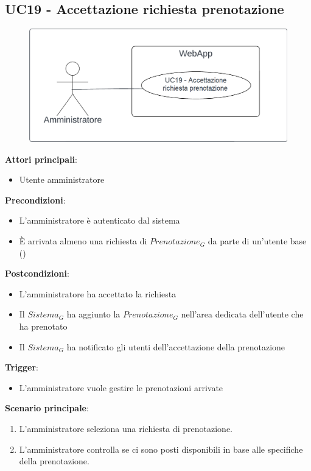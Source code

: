 \subsection{UC19 - Accettazione richiesta prenotazione}\label{usecase:19}
\begin{figure}[H]
    \centering
    \includegraphics[width=0.9\linewidth]{ucd/ucd19.png}
\end{figure}
\textbf{Attori principali}:
\begin{itemize}
    \item Utente amministratore
\end{itemize}
\textbf{Precondizioni}:
\begin{itemize}
    \item L'amministratore è autenticato dal sistema
    \item \`E arrivata almeno una richiesta di $\textit{Prenotazione}_G$ da parte di un'utente base ()
\end{itemize}
\textbf{Postcondizioni}:
\begin{itemize}
    \item L'amministratore ha accettato la richiesta
    \item Il $\textit{Sistema}_G$ ha aggiunto la $\textit{Prenotazione}_G$ nell'area dedicata dell'utente che ha prenotato
    \item Il $\textit{Sistema}_G$ ha notificato gli utenti dell'accettazione della prenotazione
\end{itemize}
\textbf{Trigger}:
\begin{itemize}
    \item L'amministratore vuole gestire le prenotazioni arrivate
\end{itemize}
\textbf{Scenario principale}:
\begin{enumerate}
    \item L'amministratore seleziona una richiesta di prenotazione.
    \item L'amministratore controlla se ci sono posti disponibili in base alle specifiche della prenotazione.
\end{enumerate}

